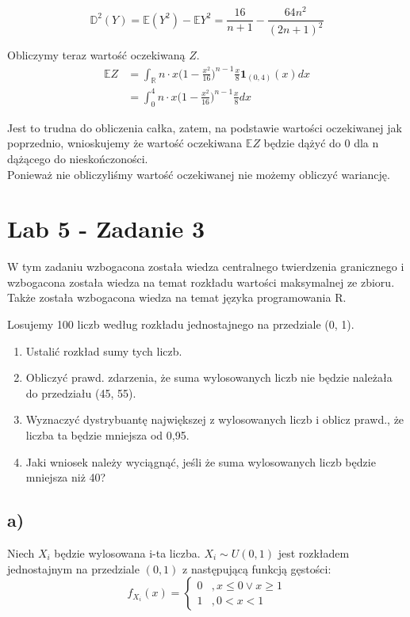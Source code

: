 \documentclass{article}
\begin{document}
{\[
\mathbb{D}^2(Y) = \mathbb{E}(Y^2) - \mathbb{E}Y^2 = \frac{16}{n+1} - \frac{64n^2}{(2n+1)^2}
\]

Obliczymy teraz wartość oczekiwaną $Z$.
\begin{align*}
\mathbb{E}Z & = \int_{\mathbb{R}}^{} n\cdot x \Big(1 - \frac{x^2}{16} \Big)^{n-1} \frac{x}{8} \textbf{1}_{(0,4)}(x) dx \\
& = \int_{0}^{4} n\cdot x \Big(1 - \frac{x^2}{16} \Big)^{n-1} \frac{x}{8} dx 
\end{align*}

Jest to trudna do obliczenia całka, zatem, na podstawie wartości oczekiwanej jak poprzednio, wnioskujemy że wartość oczekiwana $\mathbb{E}Z$ będzie dążyć do 0 dla n dążącego do nieskończoności. \\
Ponieważ nie obliczyliśmy wartość oczekiwanej nie możemy obliczyć wariancję.

\section{Lab 5 - Zadanie 3}
W tym zadaniu wzbogacona została wiedza centralnego twierdzenia granicznego i wzbogacona została wiedza na temat rozkładu wartości maksymalnej ze zbioru. Także została wzbogacona wiedza na temat języka programowania R. \\ \par

Losujemy 100 liczb według rozkładu jednostajnego na
przedziale (0, 1).
\begin{enumerate}[label = \alph*)]
\item Ustalić rozkład sumy tych liczb.
\item Obliczyć prawd. zdarzenia, że suma wylosowanych
liczb nie będzie należała do przedziału (45, 55).
\item Wyznaczyć dystrybuantę największej z wylosowanych
liczb i oblicz prawd., że liczba ta będzie mniejsza od 0,95.
\item Jaki wniosek należy wyciągnąć, jeśli że suma wylosowanych liczb będzie mniejsza niż 40?
\end{enumerate}

\subsection{a)}
Niech $X_i$ będzie wylosowana i-ta liczba. $X_i \sim U(0,1)$ jest rozkładem jednostajnym na przedziale $(0,1)$ z następującą funkcją gęstości:
\[
f_{X_i}(x) = \left\{
\begin{array}{ll}
0 &, x \leq 0 \vee x \geq 1 \\
1 &, 0 < x < 1
\end{array}
\right. 
\]

}
\end{document}
